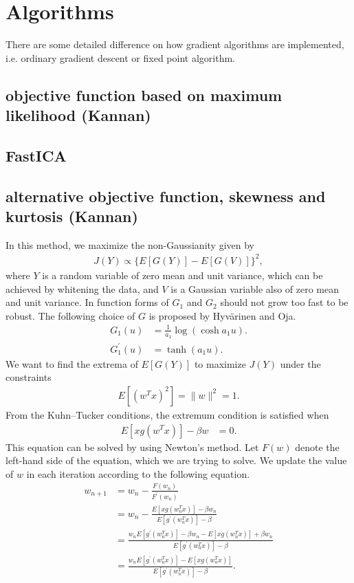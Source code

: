 \documentclass[aps,prl,preprint,superscriptaddress]{revtex4-2}
\begin{document}
\section{Algorithms}
There are some detailed difference on how gradient algorithms are implemented, i.e. ordinary gradient descent or fixed point algorithm.
\subsection{objective function based on maximum likelihood  (Kannan)}

\subsection{FastICA}
\subsection{alternative objective function, skewness and kurtosis (Kannan)}
In this method, we maximize the non-Gaussianity given by
\begin{align}
J(Y) \propto \{E[G(Y)] - E[G(V)]\}^2,
\end{align}
where $Y$ is a random variable of zero mean and unit variance, which can be achieved by whitening the data, and $V$ is a Gaussian variable also of zero mean and unit variance. In function forms of $G_1$ and $G_2$ should not grow too fast to be robust. The following choice of $G$ is proposed by Hyvärinen and Oja.
\begin{align}
G_1(u) &= \frac{1}{a_1} \log (\cosh a_1 u). \\
G_1^{\prime}(u) &= \tanh(a_1 u).
\end{align}
We want to find the extrema of $E[G(Y)]$ to maximize $J(Y)$ under the constraints
\begin{align}
E[(w^T x)^2] = \| w\|^2 = 1.
\end{align}
From the Kuhn--Tucker conditions, the extremum condition is satisfied when
\begin{align}
E[x g(w^Tx)] - \beta w &= 0.
\end{align}
This equation can be solved by using Newton's method.
Let $F(w)$ denote the left-hand side of the equation, which we are trying to solve.
We update the value of $w$ in each iteration according to the following equation.
\begin{align}
w_{n+1} &= w_n - \frac{F(w_n)}{F^{\prime}(w_n)} \\
&= w_n - \frac{E[x g (w_n^T x)] - \beta w_n}{E[g^{\prime}(w_n^T x)] - \beta} \\
&= \frac{w_n E[g^{\prime}(w_n^T x)] - \beta w_n - E[x g (w_n^T x)] + \beta w_n}{E[g^{\prime}(w_n^T x)] - \beta} \\
&= \frac{w_n E[g^{\prime}(w_n^T x)] - E[x g (w_n^T x)]}{E[g^{\prime}(w_n^T x)] - \beta}.
\end{align}
\end{document}
